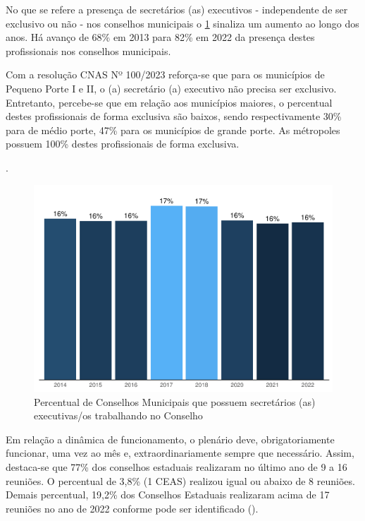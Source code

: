 \documentclass[
  brazilian]{report}
\begin{document}
No que se refere a presença de secretários (as) executivos -
independente de ser exclusivo ou não - nos conselhos municipais o
\cref{fig:cmas_se} sinaliza um aumento ao longo dos anos. Há avanço de
68\% em 2013 para 82\% em 2022 da presença destes profissionais nos
conselhos municipais.

Com a resolução CNAS Nº 100/2023 reforça-se que para os municípios de
Pequeno Porte I e II, o (a) secretário (a) executivo não precisa ser
exclusivo. Entretanto, percebe-se que em relação aos municípios maiores,
o percentual destes profissionais de forma exclusiva são baixos, sendo
respectivamente 30\% para de médio porte, 47\% para os municípios de
grande porte. As métropoles possuem 100\% destes profissionais de forma
exclusiva.

.

\begin{figure}
\includegraphics{Censo-SUAS-2022_files/figure-latex/cmas_se-1} \caption[Percentual de Conselhos Municipais que possuem secretários (as) executivas/os trabalhando no Conselho]{Percentual de Conselhos Municipais que possuem secretários (as) executivas/os trabalhando no Conselho}\label{fig:cmas_se}
\end{figure}

Em relação a dinâmica de funcionamento, o plenário deve,
obrigatoriamente funcionar, uma vez ao mês e, extraordinariamente sempre
que necessário. Assim, destaca-se que 77\% dos conselhos estaduais
realizaram no último ano de 9 a 16 reuniões. O percentual de 3,8\% (1
CEAS) realizou igual ou abaixo de 8 reuniões. Demais percentual, 19,2\%
dos Conselhos Estaduais realizaram acima de 17 reuniões no ano de 2022
conforme pode ser identificado ().
\end{document}
